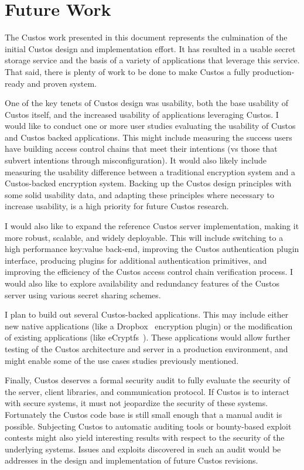\section{Future Work}

The Custos work presented in this document represents the culmination
of the initial Custos design and implementation effort. It has
resulted in a usable secret storage service and the basis of a variety
of applications that leverage this service. That said, there is plenty
of work to be done to make Custos a fully production-ready and proven
system.

One of the key tenets of Custos design was usability, both the base
usability of Custos itself, and the increased usability of
applications leveraging Custos. I would like to conduct one or more
user studies evaluating the usability of Custos and Custos backed
applications. This might include measuring the success users have
building access control chains that meet their intentions (vs those
that subvert intentions through misconfiguration). It would also
likely include measuring the usability difference between a
traditional encryption system and a Custos-backed encryption
system. Backing up the Custos design principles with some solid
usability data, and adapting these principles where necessary to
increase usability, is a high priority for future Custos research.

I would also like to expand the reference Custos server
implementation, making it more robust, scalable, and widely
deployable. This will include switching to a high performance
key:value back-end, improving the Custos authentication plugin
interface, producing plugins for additional authentication primitives,
and improving the efficiency of the Custos access control chain
verification process. I would also like to explore availability and
redundancy features of the Custos server using various secret sharing
schemes.

I plan to build out several Custos-backed applications. This may
include either new native applications (like a Dropbox~\cite{dropbox}
encryption plugin) or the modification of existing applications (like
eCryptfs~\cite{eCryptfs}). These applications would allow further
testing of the Custos architecture and server in a production
environment, and might enable some of the use cases studies previously
mentioned.

Finally, Custos deserves a formal security audit to fully evaluate the
security of the server, client libraries, and communication
protocol. If Custos is to interact with secure systems, it must not
jeopardize the security of these systems. Fortunately the Custos code
base is still small enough that a manual audit is possible. Subjecting
Custos to automatic auditing tools or bounty-based exploit contests
might also yield interesting results with respect to the security of
the underlying systems. Issues and exploits discovered in such an
audit would be addresses in the design and implementation of future
Custos revisions.

